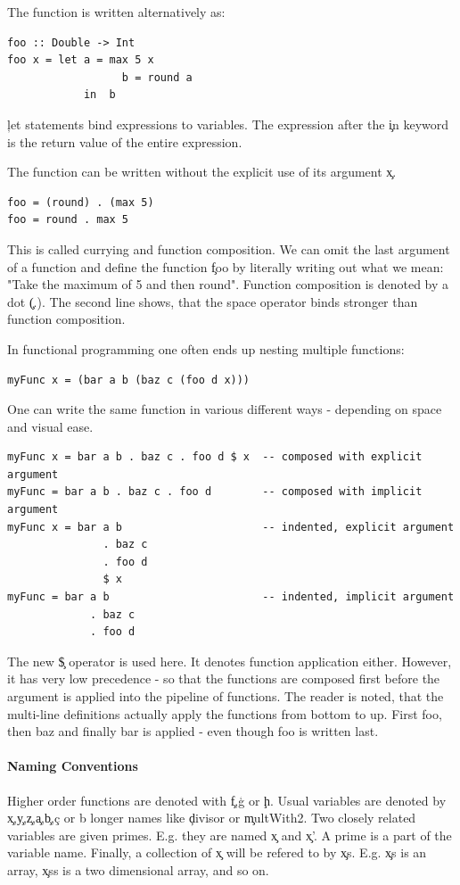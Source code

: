   The function is written alternatively as:
  \begin{lstlisting}
foo :: Double -> Int
foo x = let a = max 5 x
                  b = round a
            in  b
  \end{lstlisting}
  \c{let} statements bind expressions to variables.
  The expression after the \c{in} keyword is the return value of the
  entire expression.
  
  The function can be written without the explicit use of its argument \c{x}.
  \begin{lstlisting}
foo = (round) . (max 5)
foo = round . max 5
  \end{lstlisting}
  This is called currying and function composition.
  We can omit the last argument of a function and define the function
  \c{foo} by literally writing out what we mean:
  "Take the maximum of 5 and then round".
  Function composition is denoted by a dot \c{(.)}.
  The second line shows, that the space operator binds stronger than function composition.
  
  In functional programming one often ends up nesting multiple functions:
  \begin{lstlisting}
myFunc x = (bar a b (baz c (foo d x)))
  \end{lstlisting}
  One can write the same function in various different ways - depending on space
  and visual ease.
  \begin{lstlisting}
myFunc x = bar a b . baz c . foo d $ x  -- composed with explicit argument
myFunc = bar a b . baz c . foo d        -- composed with implicit argument
myFunc x = bar a b                      -- indented, explicit argument
               . baz c 
               . foo d
               $ x
myFunc = bar a b                        -- indented, implicit argument
             . baz c
             . foo d
  \end{lstlisting}
    The new \c{\$} operator is used here. It denotes function application either.
    However, it
    has very low precedence - so that the functions are composed first
    before the argument is applied into the pipeline of functions.
    The reader is noted, that the multi-line definitions actually apply
    the functions from bottom to up. First foo, then baz
    and finally bar is applied - even though foo is written last.
    
  \paragraph{Naming Conventions}
    Higher order functions are denoted with \c{f},\c{g} or \c{h}.
    Usual variables are denoted by \c{x},\c{y},\c{z},\c{a},\c{b},\c{c}
    or b longer names like \c{divisor} or \c{multWith2}.
    Two closely related variables are given
    primes. E.g. they are named \c{x} and \c{x'}. A prime is a part of the variable name.
    Finally, a collection of \c{x} will be refered to by \c{xs}.
    E.g. \c{xs} is an array, \c{xss} is a two dimensional array, and so on.
  
